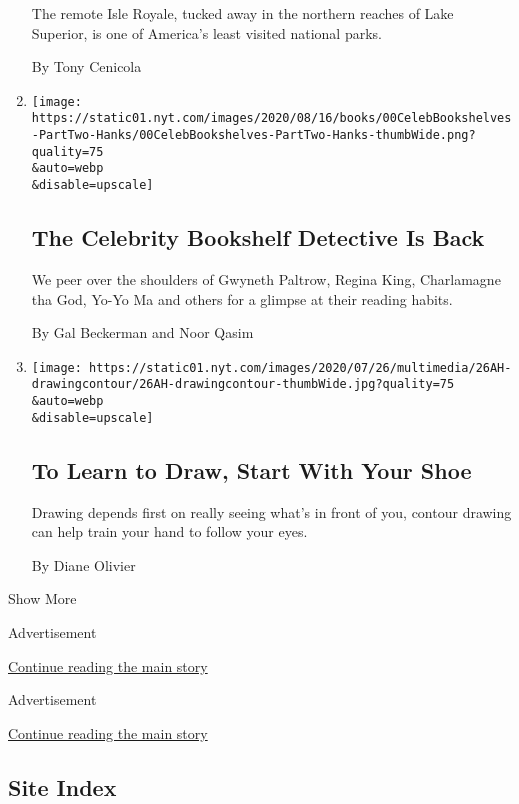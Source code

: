 \begin{enumerate}
  The remote Isle Royale, tucked away in the northern reaches of Lake
  Superior, is one of America's least visited national parks.

  By Tony Cenicola
\item
  \href{/2020/07/27/books/tom-hanks-gwyneth-paltrow-bookshelves.html}{}

  \texttt{[image: https://static01.nyt.com/images/2020/08/16/books/00CelebBookshelves-PartTwo-Hanks/00CelebBookshelves-PartTwo-Hanks-thumbWide.png?quality=75\\\&auto=webp\\\&disable=upscale]}

  \hypertarget{the-celebrity-bookshelf-detective-is-back}{%
  \subsection{The Celebrity Bookshelf Detective Is
  Back}\label{the-celebrity-bookshelf-detective-is-back}}

  We peer over the shoulders of Gwyneth Paltrow, Regina King,
  Charlamagne tha God, Yo-Yo Ma and others for a glimpse at their
  reading habits.

  By Gal Beckerman and Noor Qasim
\item
  \href{/2020/07/25/at-home/coronavirus-learn-to-draw.html}{}

  \texttt{[image: https://static01.nyt.com/images/2020/07/26/multimedia/26AH-drawingcontour/26AH-drawingcontour-thumbWide.jpg?quality=75\\\&auto=webp\\\&disable=upscale]}

  \hypertarget{to-learn-to-draw-start-with-your-shoe}{%
  \subsection{To Learn to Draw, Start With Your
  Shoe}\label{to-learn-to-draw-start-with-your-shoe}}

  Drawing depends first on really seeing what's in front of you, contour
  drawing can help train your hand to follow your eyes.

  By Diane Olivier
\end{enumerate}

Show More

Advertisement

\protect\hyperlink{after-mid2}{Continue reading the main story}

Advertisement

\protect\hyperlink{after-mktg}{Continue reading the main story}

\hypertarget{site-index}{%
\subsection{Site Index}\label{site-index}}

